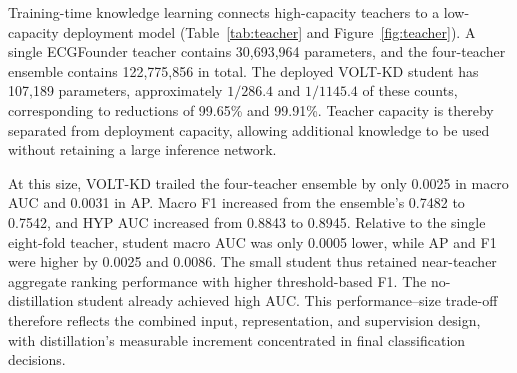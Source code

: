 \documentclass[11pt,a4paper]{article}
\begin{document}
Training-time knowledge learning connects high-capacity teachers to a low-capacity deployment model (Table~\ref{tab:teacher} and Figure~\ref{fig:teacher}). A single ECGFounder teacher contains 30,693,964 parameters, and the four-teacher ensemble contains 122,775,856 in total. The deployed VOLT-KD student has 107,189 parameters, approximately $1/286.4$ and $1/1145.4$ of these counts, corresponding to reductions of 99.65\% and 99.91\%. Teacher capacity is thereby separated from deployment capacity, allowing additional knowledge to be used without retaining a large inference network.

At this size, VOLT-KD trailed the four-teacher ensemble by only 0.0025 in macro AUC and 0.0031 in AP. Macro F1 increased from the ensemble's 0.7482 to 0.7542, and HYP AUC increased from 0.8843 to 0.8945. Relative to the single eight-fold teacher, student macro AUC was only 0.0005 lower, while AP and F1 were higher by 0.0025 and 0.0086. The small student thus retained near-teacher aggregate ranking performance with higher threshold-based F1. The no-distillation student already achieved high AUC. This performance--size trade-off therefore reflects the combined input, representation, and supervision design, with distillation's measurable increment concentrated in final classification decisions.
\end{document}
